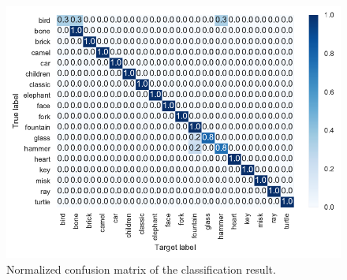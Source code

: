 \begin{figure}[H]
\centering
\includegraphics[width=.8\linewidth]{confusion_norm_mlp.pdf}
\caption{Normalized confusion matrix of the classification result.}
 \label{fig:machine_learning:python:confusion}
\end{figure}
